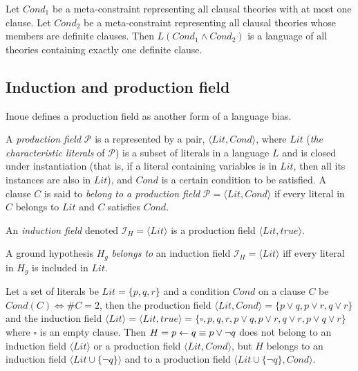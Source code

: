 \begin{exmp}
Let $Cond_1$ be a meta-constraint representing all clausal theories with at most one clause. Let $Cond_2$ be a meta-constraint representing all clausal theories whose members are definite clauses. Then $L(Cond_1 \land Cond_2)$ is a language of all theories containing exactly one definite clause.
\end{exmp}

\subsection{Induction and production field}
Inoue defines a production field as another form of a language bias.

\begin{defn}\cite{inoue2004induction}
A \emph{production field} $\mathcal{P}$ is a represented by a pair,
$\langle Lit, Cond\rangle$, where $Lit$
(\emph{the characteristic literals} of $\mathcal{P}$) is a subset of literals in a language $L$ and is closed under instantiation (that is, if a literal containing variables is in $Lit$, then all its instances are also in $Lit$), and $Cond$ is a certain condition to be satisfied. 
A clause $C$ is said to \emph{belong to a production field} $\mathcal{P} = \langle Lit, Cond \rangle$ if every literal in $C$ belongs to $Lit$ and $C$ satisfies $Cond$.
\end{defn}


\begin{defn}\label{induction_field_definition}\cite{yamamoto2012inverse}
An \emph{induction field} denoted $\mathcal{I}_H=\langle Lit \rangle$ is a production field $\langle Lit, true\rangle$.
\end{defn}

\begin{defn}\cite{yamamoto2012inverse}
A ground hypothesis $H_g$ \emph{belongs to} an induction field $\mathcal{I}_H=\langle Lit \rangle$ iff
every literal in $H_g$ is included in $Lit$.
\end{defn}

\begin{exmp}
Let a set of literals be $Lit=\{p, q, r\}$ and a condition $Cond$ on a clause $C$ be $Cond(C) \iff \#C=2$, then the production field
$\langle Lit, Cond \rangle = \{ p \lor q, p \lor r, q \lor r\}$ and the induction field $\langle Lit \rangle = \langle Lit, true \rangle = \{\square, p, q, r, p \lor q, p \lor r, q \lor r, p \lor q \lor r\}$ where $\square$ is an empty clause.
Then $H=p \leftarrow q \equiv p \lor \neg q$ does not belong to an induction field $\langle Lit \rangle$ or a production field $\langle Lit, Cond \rangle$, but $H$ belongs to an induction field $\langle Lit \cup \{\neg q\} \rangle$ and to a production field $\langle Lit \cup \{\neg q\}, Cond \rangle$.
\end{exmp}

